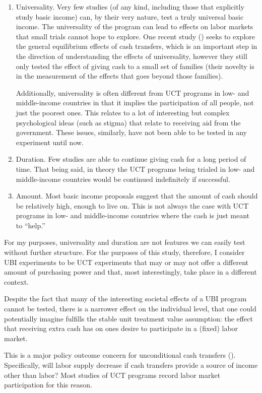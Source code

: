 \documentclass[a4paper,12pt]{article}
\begin{document}
\begin{enumerate}
\item Universality. Very few studies (of any kind, including those that explicitly study basic income) can, by their very nature, test a truly universal basic income. The universality of the program can lead to effects on labor markets that small trials cannot hope to explore. One recent study (\cite{Egger2019}) seeks to explore the general equilibrium effects of cash transfers, which is an important step in the direction of understanding the effects of universality, however they still only tested the effect of giving cash to a small set of families (their novelty is in the measurement of the effects that goes beyond those families).

Additionally, universality is often different from UCT programs in low- and middle-income countries in that it implies the participation of all people, not just the poorest ones. This relates to a lot of interesting but complex psychological ideas (such as stigma) that relate to receiving aid from the government. These issues, similarly, have not been able to be tested in any experiment until now.
\item Duration. Few studies are able to continue giving cash for a long period of time. That being said, in theory the UCT programs being trialed in low- and middle-income countries would be continued indefinitely if successful.
\item Amount. Most basic income proposals suggest that the amount of cash should be relatively high, enough to live on. This is not always the case with UCT programs in low- and middle-income countries where the cash is just meant to ``help.''
\end{enumerate}

For my purposes, universality and duration are not features we can easily test without further structure. For the purposes of this study, therefore, I consider UBI experiments to be UCT experiments that may or may not offer a different amount of purchasing power and that, most interestingly, take place in a different context.

Despite the fact that many of the interesting societal effects of a UBI program cannot be tested, there is a narrower effect on the individual level, that one could potentially imagine fulfills the stable unit treatment value assumption: the effect that receiving extra cash has on ones desire to participate in a (fixed) labor market. 

This is a major policy outcome concern for unconditional cash transfers (\cite{Hoynes2019}). Specifically, will labor supply decrease if cash transfers provide a source of income other than labor? Most studies of UCT programs record labor market participation for this reason.
\end{document}
